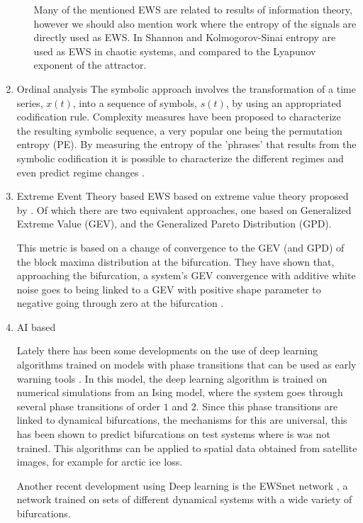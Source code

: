 \begin{enumerate}
\begin{itemize}
	Many of the mentioned EWS are related to results of information theory, however we should also mention work where the entropy of the signals are directly used as EWS. In \cite{Chen2020} Shannon and Kolmogorov-Sinai entropy are used as EWS in chaotic systems, and compared to the Lyapunov exponent of the attractor. 
\end{itemize}
\item{Ordinal analysis}
The symbolic approach
involves the transformation of a time series, $x(t)$, into a sequence of symbols, $s(t)$, by using an appropriated
codification rule. Complexity measures have been proposed to characterize the resulting symbolic sequence, a very popular one
being the permutation entropy (PE).
By measuring the entropy of the 'phrases' that results from the symbolic codification it is possible to characterize the different regimes and even predict regime changes
\citep{Masoller2015,Rubido2018,Boaretto2021}.

\item{Extreme Event Theory based}
EWS based on extreme value theory proposed by \cite{Lucarini2014}. Of which there are two equivalent approaches, one based on Generalized Extreme Value (GEV), and the Generalized Pareto Distribution (GPD). 

This metric is based on a change of convergence to the GEV (and GPD) of the block maxima distribution at the bifurcation. 
They have shown that, approaching the bifurcation, a system's GEV convergence with additive white noise goes to being linked to a GEV with positive shape parameter to negative going through zero at the bifurcation \citep{Faranda2014}. 


  

\item{AI based}

Lately there has been some developments on the use of deep learning algorithms trained on models with phase transitions that can be used as early warning tools \citep{Bury2021}.
In this model, the deep learning algorithm is trained on numerical simulations from an Ising model, where the system goes through several phase transitions of order $1$ and $2$. 
Since this phase transitions are linked to dynamical bifurcations,  the mechanisms for this are universal, this has been shown to predict bifurcations on test systems where is was not trained. 
This algorithms can be applied to spatial data obtained from satellite images, for example for arctic ice loss. 

Another recent development using Deep learning is the EWSnet network \citep{Deb2022}, a network trained on sets of different dynamical systems with a wide variety of bifurcations. 

\end{enumerate}


